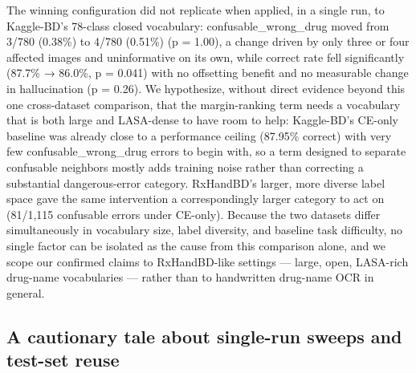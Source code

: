 \documentclass[fleqn,10pt]{wlpeerj}
\begin{document}
The winning configuration did not replicate when applied, in a single run, to Kaggle-BD's 78-class closed vocabulary: confusable\_wrong\_drug moved from 3/780 (0.38\%) to 4/780 (0.51\%) (p = 1.00), a change driven by only three or four affected images and uninformative on its own, while correct rate fell significantly (87.7\% → 86.0\%, p = 0.041) with no offsetting benefit and no measurable change in hallucination (p = 0.26). We hypothesize, without direct evidence beyond this one cross-dataset comparison, that the margin-ranking term needs a vocabulary that is both large and LASA-dense to have room to help: Kaggle-BD's CE-only baseline was already close to a performance ceiling (87.95\% correct) with very few confusable\_wrong\_drug errors to begin with, so a term designed to separate confusable neighbors mostly adds training noise rather than correcting a substantial dangerous-error category. RxHandBD's larger, more diverse label space gave the same intervention a correspondingly larger category to act on (81/1,115 confusable errors under CE-only). Because the two datasets differ simultaneously in vocabulary size, label diversity, and baseline task difficulty, no single factor can be isolated as the cause from this comparison alone, and we scope our confirmed claims to RxHandBD-like settings --- large, open, LASA-rich drug-name vocabularies --- rather than to handwritten drug-name OCR in general.

\subsection*{A cautionary tale about single-run sweeps and test-set reuse}\label{sec:disc-cautionary}
\end{document}
